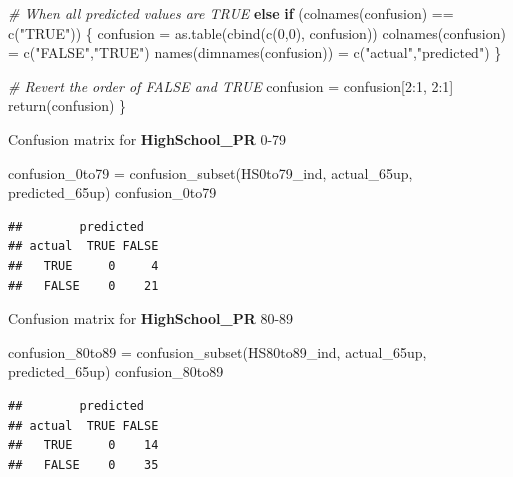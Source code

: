 \documentclass[
]{article}
\newenvironment{Shaded}{\begin{snugshade}}{\end{snugshade}}
\newcommand{\CommentTok}[1]{\textcolor[rgb]{0.56,0.35,0.01}{\textit{#1}}}
\newcommand{\ControlFlowTok}[1]{\textcolor[rgb]{0.13,0.29,0.53}{\textbf{#1}}}
\newcommand{\DecValTok}[1]{\textcolor[rgb]{0.00,0.00,0.81}{#1}}
\newcommand{\FunctionTok}[1]{\textcolor[rgb]{0.00,0.00,0.00}{#1}}
\newcommand{\NormalTok}[1]{#1}
\newcommand{\OtherTok}[1]{\textcolor[rgb]{0.56,0.35,0.01}{#1}}
\newcommand{\SpecialCharTok}[1]{\textcolor[rgb]{0.00,0.00,0.00}{#1}}
\newcommand{\StringTok}[1]{\textcolor[rgb]{0.31,0.60,0.02}{#1}}
\begin{document}
\begin{Shaded}
\begin{Highlighting}[]
  \CommentTok{\# When all predicted values are TRUE}
  \ControlFlowTok{else} \ControlFlowTok{if}\NormalTok{ (}\FunctionTok{colnames}\NormalTok{(confusion) }\SpecialCharTok{==} \FunctionTok{c}\NormalTok{(}\StringTok{"TRUE"}\NormalTok{)) \{}
\NormalTok{    confusion }\OtherTok{=} \FunctionTok{as.table}\NormalTok{(}\FunctionTok{cbind}\NormalTok{(}\FunctionTok{c}\NormalTok{(}\DecValTok{0}\NormalTok{,}\DecValTok{0}\NormalTok{), confusion))}
    \FunctionTok{colnames}\NormalTok{(confusion) }\OtherTok{=} \FunctionTok{c}\NormalTok{(}\StringTok{"FALSE"}\NormalTok{,}\StringTok{"TRUE"}\NormalTok{)}
    \FunctionTok{names}\NormalTok{(}\FunctionTok{dimnames}\NormalTok{(confusion)) }\OtherTok{=} \FunctionTok{c}\NormalTok{(}\StringTok{"actual"}\NormalTok{,}\StringTok{"predicted"}\NormalTok{)}
\NormalTok{  \}}
  
  \CommentTok{\# Revert the order of FALSE and TRUE}
\NormalTok{  confusion }\OtherTok{=}\NormalTok{ confusion[}\DecValTok{2}\SpecialCharTok{:}\DecValTok{1}\NormalTok{, }\DecValTok{2}\SpecialCharTok{:}\DecValTok{1}\NormalTok{] }
  \FunctionTok{return}\NormalTok{(confusion)}
\NormalTok{\}}
\end{Highlighting}
\end{Shaded}

Confusion matrix for \textbf{HighSchool\_PR} 0-79

\begin{Shaded}
\begin{Highlighting}[]
\NormalTok{confusion\_0to79 }\OtherTok{=} \FunctionTok{confusion\_subset}\NormalTok{(HS0to79\_ind, actual\_65up, predicted\_65up)}
\NormalTok{confusion\_0to79}
\end{Highlighting}
\end{Shaded}

\begin{verbatim}
##        predicted
## actual  TRUE FALSE
##   TRUE     0     4
##   FALSE    0    21
\end{verbatim}

Confusion matrix for \textbf{HighSchool\_PR} 80-89

\begin{Shaded}
\begin{Highlighting}[]
\NormalTok{confusion\_80to89 }\OtherTok{=} \FunctionTok{confusion\_subset}\NormalTok{(HS80to89\_ind, actual\_65up, predicted\_65up)}
\NormalTok{confusion\_80to89}
\end{Highlighting}
\end{Shaded}

\begin{verbatim}
##        predicted
## actual  TRUE FALSE
##   TRUE     0    14
##   FALSE    0    35
\end{verbatim}
\end{document}
